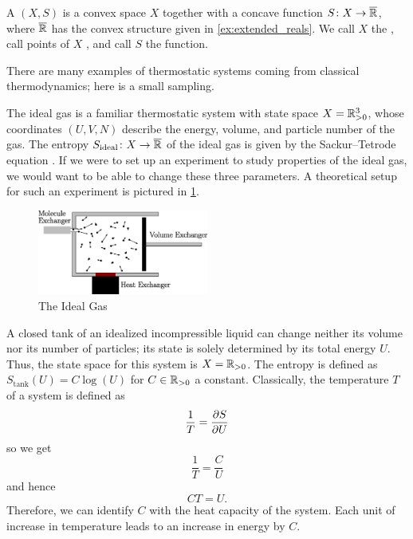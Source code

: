 \documentclass[12pt, reqno]{amsart}
\newcommand{\pos}{\real_{> 0}}
\newcommand{\extreal}{\overline{\real}}
\newcommand{\Sgas}{S_{\mathrm{ideal}}} %
\newcommand{\Stank}{S_{\mathrm{tank}}} %
\begin{document}
\begin{definition}
    A  $(X, S)$ is a convex space $X$ together with a concave function $S \maps X \to \extreal$, where $\extreal$ has the convex structure given in \cref{ex:extended_reals}. We call $X$ the , call points of $X$ , and call $S$ the  function.
\end{definition}

There are many examples of thermostatic systems coming from classical thermodynamics; here is a small sampling.

\begin{example}
\label{ex:ideal_gas}
    The ideal gas is a familiar thermostatic system with state space $X = \pos^3$, whose coordinates $(U, V, N)$ describe the energy, volume, and particle number of the gas. The entropy $\Sgas \maps X \to \extreal$ of the ideal gas is given by the Sackur--Tetrode equation \cite{SackurTetrode}. If we were to set up an experiment to study properties of the ideal gas, we would want to be able to change these three parameters. A theoretical setup for such an experiment is pictured in \cref{fig:ideal_gas}.
\end{example}

\begin{figure}
    \centering
    \includegraphics[width=0.5\textwidth]{figures/ideal_gas.eps}
    \caption{The Ideal Gas}
    \label{fig:ideal_gas}
\end{figure}

\begin{example}
\label{ex:tank}
    A closed tank of an idealized incompressible liquid can change neither its volume nor its number of particles; its state is solely determined by its total energy $U$. Thus, the state space for this system is $X= \pos$. The entropy is defined as $\Stank(U) = C\log(U)$ for $C \in \pos$ a constant. Classically, the temperature $T$ of a system is defined as
    \[ \frac{1}{T} = \pdv{S}{U} \]
    so we get
    \[ \frac{1}{T} = \frac{C}{U} \]
    and hence
    \[ CT = U. \]
    Therefore, we can identify $C$ with the heat capacity of the system. Each unit of increase in temperature leads to an increase in energy by $C$.
\end{example}
\end{document}
